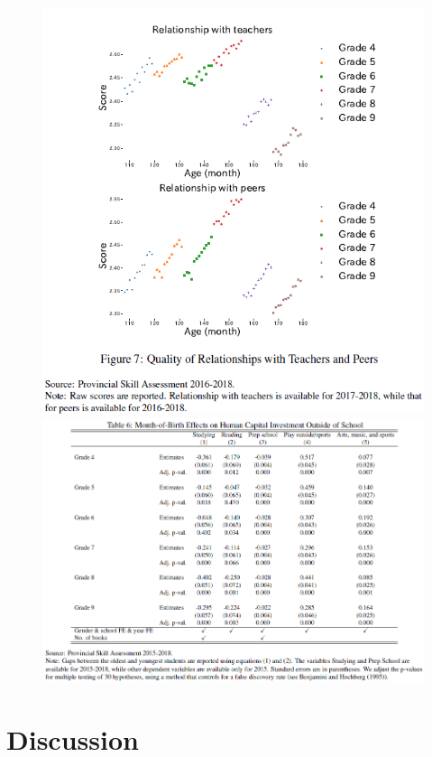 \documentclass[../root]{subfiles}
\begin{document}
    \begin{figure}[ht]
      \centering
      \includegraphics[scale = 1]{0904tanji/F7}
      \includegraphics[scale = 1]{0904tanji/T6}
    \end{figure}

    \section{Discussion}
\end{document}
